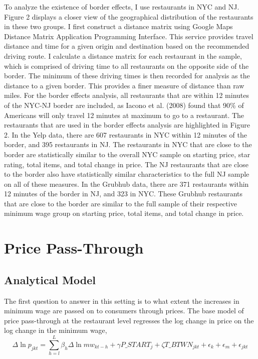 \documentclass[11pt]{article}
\begin{document}
To analyze the existence of border effects, I use restaurants in NYC and NJ. Figure 2 displays a closer view of the geographical distribution of the restaurants in these two groups. I first construct a distance matrix using Google Maps Distance Matrix Application Programming Interface. This service provides travel distance and time for a given origin and destination based on the recommended driving route. I calculate a distance matrix for each restaurant in the sample, which is comprised of driving time to all restaurants on the opposite side of the border. The minimum of these driving times is then recorded for analysis as the distance to a given border. This provides a finer measure of distance than raw miles.  For the border effects analysis, all restaurants that are within 12 minutes of the NYC-NJ border are included, as Iacono et al. (2008) found that 90\% of Americans will only travel 12 minutes at maximum to go to a restaurant\nocite{drivingtime}. The restaurants that are used in the border effects analysis are highlighted in Figure 2. In the Yelp data, there are 607 restaurants in NYC within 12 minutes of the border, and 395 restaurants in NJ. The restaurants in NYC that are close to the border are statistically similar to the overall NYC sample on starting price, star rating, total items, and total change in price. %
The NJ restaurants that are close to the border also have statistically similar characteristics to the full NJ sample on all of these measures. In the Grubhub data, there are 371 restaurants within 12 minutes of the border in NJ, and 323 in NYC. These Grubhub restaurants that are close to the border are similar to the full sample of their respective minimum wage group on starting price, total items, and total change in price. 




\section{Price Pass-Through}

\subsection{Analytical Model}

The first question to answer in this setting is to what extent the increases in minimum wage are passed on to consumers through prices. The base model of price pass-through at the restaurant level regresses the log change in price on the log change in the minimum wage,
\begin{dmath}
\Delta \ln p_{jkt} = \sum_{h=l}^{L}\beta_h \Delta \ln mw_{kt-h} + \gamma  P\_START_{j} + \zeta T\_BTWN_{jkt}   + \epsilon_k + \epsilon_m +\epsilon_{jkt}
\end{dmath}
\end{document}
